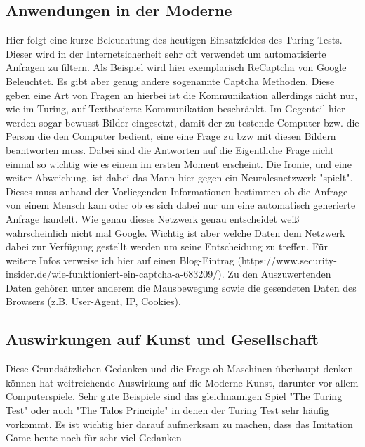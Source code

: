 \subsection{Anwendungen in der Moderne}
Hier folgt eine kurze Beleuchtung des heutigen Einsatzfeldes des Turing Tests. Dieser wird in der Internetsicherheit sehr oft verwendet um automatisierte Anfragen zu filtern. Als Beispiel wird hier exemplarisch ReCaptcha von Google Beleuchtet. Es gibt aber genug andere sogenannte Captcha Methoden. Diese geben eine Art von Fragen an hierbei ist die Kommunikation allerdings nicht nur, wie im Turing, auf Textbasierte Kommunikation beschränkt. Im Gegenteil hier werden sogar bewusst Bilder eingesetzt, damit der zu testende Computer bzw. die Person die den Computer bedient, eine eine Frage zu bzw mit diesen Bildern beantworten muss. Dabei sind die Antworten auf die Eigentliche Frage nicht einmal so wichtig wie es einem im ersten Moment erscheint. Die Ironie, und eine weiter Abweichung, ist dabei das Mann hier gegen ein Neuralesnetzwerk "spielt". Dieses muss anhand der Vorliegenden Informationen bestimmen ob die Anfrage von einem Mensch kam oder ob es sich dabei nur um eine automatisch generierte Anfrage handelt. Wie genau dieses Netzwerk genau entscheidet weiß wahrscheinlich nicht mal Google. Wichtig ist aber welche Daten dem Netzwerk dabei zur Verfügung gestellt werden um seine Entscheidung zu treffen. Für weitere Infos verweise ich hier auf einen Blog-Eintrag (https://www.security-insider.de/wie-funktioniert-ein-captcha-a-683209/). Zu den Auszuwertenden Daten gehören unter anderem die Mausbewegung sowie die gesendeten Daten des Browsers (z.B. User-Agent, IP, Cookies).
\subsection{Auswirkungen auf Kunst und Gesellschaft}
Diese Grundsätzlichen Gedanken und die Frage ob Maschinen überhaupt denken können hat weitreichende Auswirkung auf die Moderne Kunst, darunter vor allem Computerspiele. Sehr gute Beispiele sind das gleichnamigen Spiel "The Turing Test" oder auch "The Talos Principle" in denen der Turing Test sehr häufig vorkommt. Es ist wichtig hier darauf aufmerksam zu machen, dass das Imitation Game heute noch für sehr viel Gedanken 

